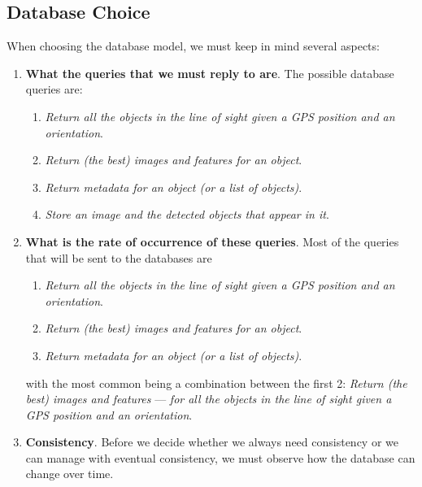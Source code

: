 \documentclass[a4paper,onecolumn,oneside,titlepage,12pt]{report}
\begin{document}
	\subsection{Database Choice}
	When choosing the database model, we must keep in mind several aspects:
	\begin{enumerate}
		\item \textbf{What the queries that we must reply to are}. The possible database queries are:
		\begin{enumerate}
			\item \emph{Return all the objects in the line of sight given a GPS position and an orientation}.
			\item \emph{Return (the best) images and features for an object}.
			\item \emph{Return metadata for an object (or a list of objects)}.
			\item \emph{Store an image and the detected objects that appear in it}.
		\end{enumerate}
		\item \textbf{What is the rate of occurrence of these queries}. Most of the queries that will be sent to the databases are
		\begin{enumerate}
			\item \emph{Return all the objects in the line of sight given a GPS position and an orientation}.
			\item \emph{Return (the best) images and features for an object}.
			\item \emph{Return metadata for an object (or a list of objects)}.
		\end{enumerate}
		with the most common being a combination between the first 2: \emph{Return (the best) images and features} --- \emph{for all the objects in the line of sight given a GPS position and an orientation}.
		\item \textbf{Consistency}. Before we decide whether we always need consistency or we can manage with eventual consistency, we must observe how the database can change over time.
		

\end{enumerate}
\end{document}
